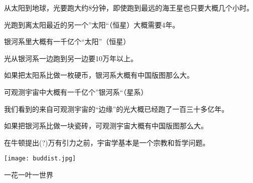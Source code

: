 \documentclass[CJK]{beamer}
\begin{document}
\begin{frame}
  \bch
 \bcenter 
 从太阳到地球，光要跑大约8分钟，即使跑到最远的海王星也只要大概几个小时。
  \ecenter
  \ech
\end{frame}


\begin{frame}
  \bch
 \bcenter 
 光跑到离太阳最近的另一个”太阳“（恒星）大概需要4年。
  \ecenter
  \ech
\end{frame}


\begin{frame}
  \bch
  \emini
  银河系里大概有一千亿个“太阳”（恒星）

  \skipline
  
  光从银河系一边跑到另一边要10万年以上。
  \emini

  {\scriptsize 如果把太阳系比做一枚硬币，银河系大概有中国版图那么大。}

  \ech
\end{frame}


\begin{frame}
  \bch
  \emini
  可观测宇宙中大概有一千亿个”银河系“（星系）

  \skipline
  
  我们看到的来自可观测宇宙的“边缘”的光大概已经跑了一百三十多亿年。
  \emini

  {\scriptsize 如果把银河系比做一块瓷砖，可观测宇宙大概有中国版图那么大。}
  
  \ech
\end{frame}

\begin{frame}
  \bch
  在牛顿提出(?)万有引力之前，宇宙学基本是一个宗教和哲学问题。
  \ech
\end{frame}


\begin{frame}
\bch
\begin{minipage}{0.45\textwidth}
\texttt{[image: buddist.jpg]}
\end{minipage}
\begin{minipage}{0.45\textwidth}
{\Large 一花一叶一世界}
\end{minipage}
\ech
\end{frame}
\end{document}
